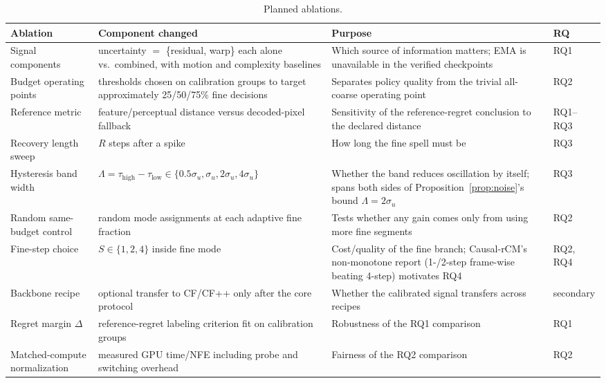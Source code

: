 \documentclass[11pt,a4paper]{article}
\begin{document}
\begin{table}[ht]
\centering
\small
\renewcommand{\arraystretch}{1.35}
\begin{tabularx}{\textwidth}{>{\raggedright\arraybackslash}p{3.6cm} >{\raggedright\arraybackslash}X >{\raggedright\arraybackslash}X >{\raggedright\arraybackslash}p{1.8cm}}
\toprule
\textbf{Ablation} & \textbf{Component changed} & \textbf{Purpose} & \textbf{RQ} \\
\midrule
Signal components & uncertainty $=$ \{residual, warp\} each alone vs.\ combined, with motion and complexity baselines & Which source of information matters; EMA is unavailable in the verified checkpoints & RQ1 \\
Budget operating points & thresholds chosen on calibration groups to target approximately 25/50/75\% fine decisions & Separates policy quality from the trivial all-coarse operating point & RQ2 \\
Reference metric & feature/perceptual distance versus decoded-pixel fallback & Sensitivity of the reference-regret conclusion to the declared distance & RQ1--RQ3 \\
Recovery length sweep & $R$ steps after a spike & How long the fine spell must be & RQ3 \\
Hysteresis band width & $\Lambda = \tau_{\mathrm{high}}-\tau_{\mathrm{low}} \in \{0.5\sigma_u, \sigma_u, 2\sigma_u, 4\sigma_u\}$ & Whether the band reduces oscillation by itself; spans both sides of Proposition~\ref{prop:noise}'s bound $\Lambda = 2\sigma_u$ & RQ3 \\
Random same-budget control & random mode assignments at each adaptive fine fraction & Tests whether any gain comes only from using more fine segments & RQ2 \\
Fine-step choice & $S \in \{1,2,4\}$ inside fine mode & Cost/quality of the fine branch; Causal-rCM's non-monotone report (1-/2-step frame-wise beating 4-step) motivates RQ4 & RQ2, RQ4 \\
Backbone recipe & optional transfer to CF/CF++ only after the core protocol & Whether the calibrated signal transfers across recipes & secondary \\
Regret margin $\Delta$ & reference-regret labeling criterion fit on calibration groups & Robustness of the RQ1 comparison & RQ1 \\
Matched-compute normalization & measured GPU time/NFE including probe and switching overhead & Fairness of the RQ2 comparison & RQ2 \\
\bottomrule
\end{tabularx}
\caption{Planned ablations.}
\label{tab:ablations}
\end{table}
\FloatBarrier
\newpage
\end{document}
